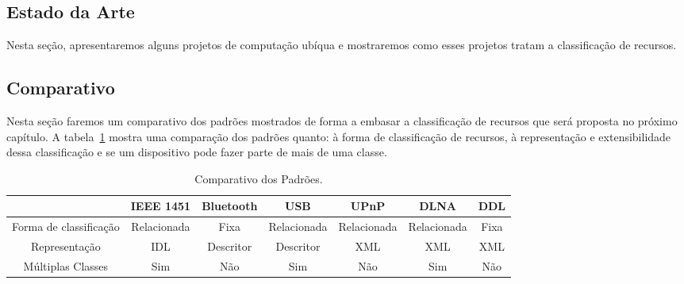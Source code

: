






\subsection{Estado da Arte}
Nesta seção, apresentaremos alguns projetos de computação ubíqua e mostraremos como esses projetos tratam a classificação de recursos.





\subsection{Comparativo}
Nesta seção faremos um comparativo dos padrões mostrados de forma a embasar a classificação de recursos que será proposta no próximo capítulo. A tabela~\ref{tab:comparativo} mostra uma comparação dos padrões quanto: à forma de classificação de recursos, à representação e extensibilidade dessa classificação e se um dispositivo pode fazer parte de mais de uma classe.

\begin{table}
	\caption{Comparativo dos Padrões.}
	\begin{center}
	\resizebox{16cm}{!} {
		\begin{tabular}{ccccccc}
		\hline
							& \textbf{IEEE 1451}	& \textbf{Bluetooth} 	& \textbf{USB}	& \textbf{UPnP} & \textbf{DLNA} & \textbf{DDL}\\
		\hline
		Forma de classificação 		& Relacionada 			& Fixa 					& Relacionada 	& Relacionada 	& Relacionada 	& Fixa \\
		\hline
		Representação 		& IDL 					& Descritor				& Descritor		& XML			& XML 			& XML \\ 
		\hline
		Múltiplas Classes 	& Sim 					& Não					& Sim 			& Não 			& Sim 			& Não \\
		\hline
		\end{tabular}
	}
	\end{center}
	\label{tab:comparativo}
\end{table}
 

